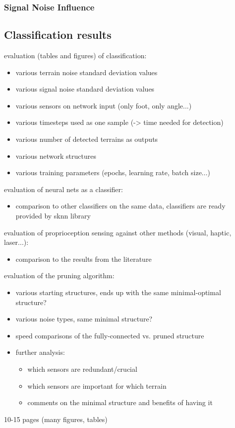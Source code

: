 \subsubsection*{Signal Noise Influence} \label{sssec:signal_noise_influence}

\subsection{Classification results} \label{ssec:classification_results}

evaluation (tables and figures) of classification:
\begin{itemize}
\item various terrain noise standard deviation values
\item various signal noise standard deviation values
\item various sensors on network input (only foot, only angle...)
\item various timesteps used as one sample (-> time needed for detection)
\item various number of detected terrains as outputs
\item various network structures
\item various training parameters (epochs, learning rate, batch size...)
\end{itemize}


evaluation of neural nets as a classifier:
\begin{itemize}
\item comparison to other classifiers on the same data, classifiers are ready provided by sknn library
\end{itemize}

evaluation of proprioception sensing against other methods (visual, haptic, laser...):
\begin{itemize}
\item comparison to the results from the literature
\end{itemize}

evaluation of the pruning algorithm:
\begin{itemize}
\item various starting structures, ends up with the same minimal-optimal structure?
\item various noise types, same minimal structure?
\item speed comparisons of the fully-connected vs. pruned structure
\item further analysis:
 \begin{itemize}
 \item which sensors are redundant/crucial
 \item which sensors are important for which terrain
 \item comments on the minimal structure and benefits of having it
 \end{itemize}
\end{itemize}
10-15 pages (many figures, tables)
